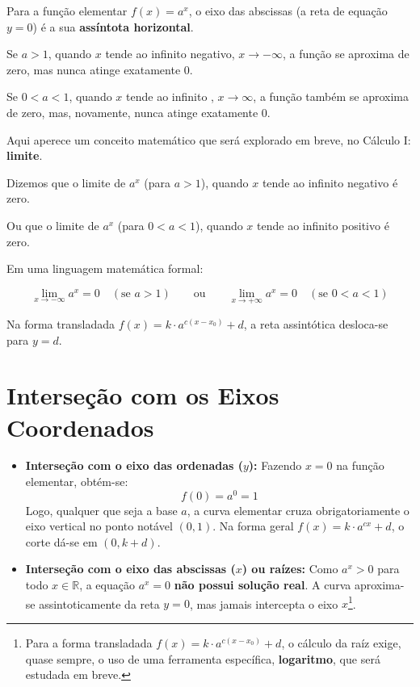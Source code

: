 \documentclass[12pt,a4paper]{report}
\begin{document}
	\begin{destaque}
		\label{dest:assintota}
		Para a função elementar $f(x) = a^x$, o eixo das abscissas (a reta de equação $y = 0$) é a sua \textbf{assíntota horizontal}.
		
		Se $a>1$, quando $x$ tende ao infinito negativo, $x \to -\infty$, a função se aproxima de zero, mas nunca atinge exatamente 0.
		
		Se $0<a<1$, quando $x$ tende ao infinito , $x \to \infty$, a função também se aproxima de zero, mas, novamente, nunca atinge exatamente 0.
		
		Aqui aperece um conceito matemático que será explorado em breve, no Cálculo I: \textbf{limite}. 
		
		Dizemos que o limite de $a^x$ (para $a>1$), quando $x$ tende ao infinito negativo é zero.
		
		Ou que o limite de $a^x$ (para $0<a<1$), quando $x$ tende ao infinito positivo é zero.
		
		Em uma linguagem matemática formal:
		
		$$\lim_{x \to -\infty} a^x = 0 \quad (\text{se } a > 1) \qquad \text{ou} \qquad \lim_{x \to +\infty} a^x = 0 \quad (\text{se } 0 < a < 1)$$
		
		Na forma transladada $f(x) = k \cdot a^{c(x-x_0)} + d$, a reta assintótica desloca-se para $y = d$.
	\end{destaque}
	
	\section{Interseção com os Eixos Coordenados}
	\label{subsec:intersecoes}
	
	\begin{itemize}
		\item \textbf{Interseção com o eixo das ordenadas ($y$):} Fazendo $x = 0$ na função elementar, obtém-se:
		$$f(0) = a^0 = 1$$
		Logo, qualquer que seja a base $a$, a curva elementar cruza obrigatoriamente o eixo vertical no ponto notável $(0, 1)$. Na forma geral $f(x) = k \cdot a^{cx} + d$, o corte dá-se em $(0, k + d)$.
		\item \textbf{Interseção com o eixo das abscissas ($x$) ou raízes:} Como $a^x > 0$ para todo $x \in \mathbb{R}$, a equação $a^x = 0$ \textbf{não possui solução real}. A curva aproxima-se assintoticamente da reta $y = 0$, mas jamais intercepta o eixo $x$\footnote{Para a forma transladada $f(x) = k \cdot a^{c(x-x_0)} + d$, o cálculo da raíz exige, quase sempre, o uso de uma ferramenta específica, \textbf{logaritmo}, que será estudada em breve.}.
		
		
	\end{itemize}
	
\end{document}
